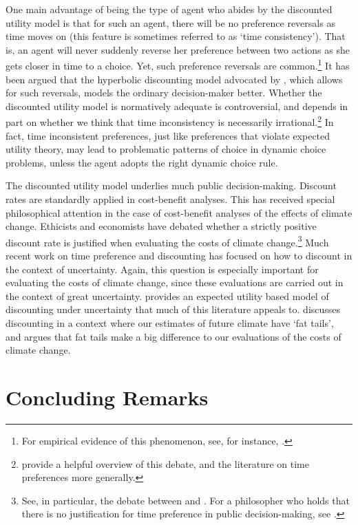 One main advantage of being the type of agent who abides by the discounted utility model is that for such an agent, there will be no preference reversals as time moves on (this feature is sometimes referred to as `time consistency'). That is, an agent will never suddenly reverse her preference between two actions as she gets closer in time to a choice. Yet, such preference reversals are common.\footnote{For empirical evidence of this phenomenon, see, for instance, \citet{Thaler1981}.} It has been argued that the hyperbolic discounting model advocated by \citet{Ainslie1992}, which allows for such reversals, models the ordinary decision-maker better. Whether the discounted utility model is normatively adequate is controversial, and depends in part on whether we think that time inconsistency is necessarily irrational.\footnote{\citet{Fredericketal2002} provide a helpful overview of this debate, and the literature on time preferences more generally.} In fact, time inconsistent preferences, just like preferences that violate expected utility theory, may lead to problematic patterns of choice in dynamic choice problems, unless the agent adopts the right dynamic choice rule.

The discounted utility model underlies much public decision-making. Discount rates are standardly applied in cost-benefit analyses. This has received special philosophical attention in the case of cost-benefit analyses of the effects of climate change. Ethicists and economists have debated whether a strictly positive discount rate is justified when evaluating the costs of climate change.\footnote{See, in particular, the debate between \citet{Stern2007} and \citet{Nordhaus2007}. For a philosopher who holds that there is no justification for time preference in public decision-making, see \citet{Broome1994}.} Much recent work on time preference and discounting has focused on how to discount in the context of uncertainty. Again, this question is especially important for evaluating the costs of climate change, since these evaluations are carried out in the context of great uncertainty. \citet{Gollier2002} provides an expected utility based model of discounting under uncertainty that much of this literature appeals to. \citet{Weitzman2009} discusses discounting in a context where our estimates of future climate have `fat tails', and argues that fat tails make a big difference to our evaluations of the costs of climate change.

\section{Concluding Remarks}

